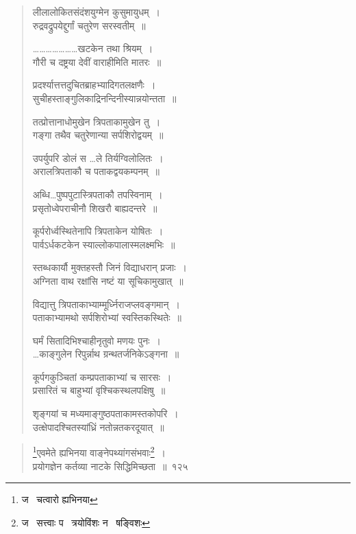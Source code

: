 \documentclass[11pt, openany]{book}
\begin{document}
\begin{quote}
{\qt लीलालोकितसंदंशयुग्मेन कुसुमायुधम्~।\\
रुद्रवद्रुपयेद्दुर्गां चतुरेण सरस्वतीम्~॥

\ldots \ldots \ldots \ldots \ldots \ldots \ldots खटकेन तथा श्रियम्~।\\
गौरी च दष्ट्रया देवीं वाराहीमिति मातरः~॥

प्रदर्श्यात्तत्तदुचितब्राहभ्यादिगतलक्षणैः~।\\
सुचीहस्ताङ्गुलिकाद्रिनन्दिनीस्यान्नयोन्तता~॥

तत्प्रोत्तानाधोमुखेन त्रिपताकामुखेन तु~।\\
गङ्गा तथैव चतुरेणान्या सर्पशिरोद्वयम्~॥

उपर्युपरि डोलं स \ldots ले तिर्यग्विलोलितः~।\\
अरालत्रिपताकौ च पताकद्वयकम्पनम्~॥

अब्धि\ldots पुष्पपुटास्त्रिपताकौ तपस्विनाम्~।\\
प्रसृतोध्वेपराचीनौ शिखरौ बाह्यदन्तरे~॥

कूर्परोर्ध्वस्थितेनापि त्रिपताकेन योषितः~।\\
पार्वऽर्धकटकेन स्याल्लोकपालास्मलक्ष्मभिः~॥

स्तब्धकार्यौ मुक्तहस्तौ जिनं विद्याधरान् प्रजाः~।\\
अग्निता वाथ रक्षांसि नष्टं या सूचिकामुखात्~॥

विद्यात्तु त्रिपताकाभ्याम्मूर्ध्निराजप्लवङ्गमान्~।\\
पताकाभ्यामथो सर्पशिरोभ्यां स्वस्तिकस्थितेः~॥

घर्मं सितादिभिश्चाहीनृतुवो मणयः पुनः~।\\
\ldots काङ्गुलेन रिपुर्न्नाथ ग्रन्थतर्जनिकेऽङ्गना~॥

कूर्पगकुञ्चितां कम्प्रपताकाभ्यां च सारसः~।\\
प्रसारितं च बाहुभ्यां वृश्चिकस्थलपक्षिषु~॥

शृङ्गयां च मध्यमाङ्गुष्ठपताकामस्तकोपरि~।\\
उत्क्षेपादश्चितस्यांध्रिं नतोन्नतकरदूयात्~॥}
\end{quote}

\newpage

\begin{quote}
{\na \renewcommand{\thefootnote}{1}\footnote{ज \textendash\  चत्वारो ह्यभिनया}एवमेते ह्यभिनया वाङ्नेपथ्यांगसंभवाः\renewcommand{\thefootnote}{2}\footnote{ज \textendash\  सत्त्वाः प \textendash\  त्रयोविंशः न \textendash\  षङ्विशः}~।\\
प्रयोगज्ञेन कर्तव्या नाटके सिद्धिमिच्छता~॥~१२५}
\end{quote}
\end{document}
